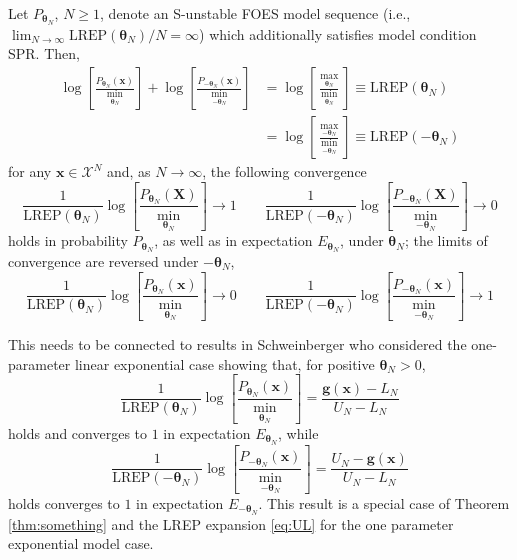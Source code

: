 \documentclass[12pt]{article}
\theoremstyle{definition}
\newcommand{\REP}{\mathrm{LREP}}
\let\BeginKnitrBlock\begin \let\EndKnitrBlock\end
\begin{document}
\BeginKnitrBlock{theorem}
\protect\hypertarget{thm:something}{}{\label{thm:something}}Let
\(P_{\boldsymbol \theta_N}\), \(N \geq 1\), denote an S-unstable FOES
model sequence (i.e.,
\(\lim_{N\to \infty}\REP(\boldsymbol \theta_N)/N=\infty\)) which
additionally satisfies model condition SPR. Then,
\begin{align*}
\log\left[ \frac{P_{\boldsymbol \theta_N }(\boldsymbol x) }{\min_{\boldsymbol \theta_N}}\right] +  \log\left[ \frac{P_{-\boldsymbol \theta_N }(\boldsymbol x) }{\min_{-\boldsymbol \theta_N}}\right]  &=    \log\left[ \frac{\max_{\boldsymbol \theta_N}}{\min_{\boldsymbol \theta_N}}\right]  \equiv  \REP(\boldsymbol \theta_N)\\
& = \log\left[ \frac{\max_{-\boldsymbol \theta_N} }{\min_{-\boldsymbol \theta_N}}\right] \equiv \REP(-\boldsymbol \theta_N)
\end{align*}
for any \(\boldsymbol x\in\mathcal{X}^N\) and, as \(N\to \infty\), the
following convergence \[
\frac{1}{\REP(\boldsymbol \theta_N)} \log\left[ \frac{P_{\boldsymbol \theta_N }(\boldsymbol X) }{\min_{\boldsymbol \theta_N}}\right]  \rightarrow 1 \qquad \frac{1}{\REP(-\boldsymbol \theta_N)}\log\left[ \frac{P_{-\boldsymbol \theta_N }(\boldsymbol X) }{\min_{-\boldsymbol \theta_N}}\right]  \rightarrow 0
\] holds in probability \(P_{\boldsymbol \theta_N}\), as well as in
expectation \(E_{\boldsymbol \theta_N}\), under
\(\boldsymbol \theta_N\); the limits of convergence are reversed under
\(-\boldsymbol \theta_N\), \[
\frac{1}{\REP(\boldsymbol \theta_N)} \log\left[ \frac{P_{\boldsymbol \theta_N }(\boldsymbol x) }{\min_{\boldsymbol \theta_N}}\right]  \rightarrow 0 \qquad \frac{1}{\REP(-\boldsymbol \theta_N)}\log\left[ \frac{P_{-\boldsymbol \theta_N }(\boldsymbol x) }{\min_{-\boldsymbol \theta_N}}\right]  \rightarrow 1
\]
\EndKnitrBlock{theorem} This needs to be connected to results in
Schweinberger who considered the one-parameter linear exponential case
showing that, for positive \(\boldsymbol \theta_N>0\), \[
\frac{1}{\REP(\boldsymbol \theta_N)} \log\left[ \frac{P_{\boldsymbol \theta_N }(\boldsymbol x) }{\min_{\boldsymbol \theta_N}}\right] = \frac{\boldsymbol g(\boldsymbol x) - L_N}{U_N-L_N} 
\] holds and converges to \(1\) in expectation
\(E_{\boldsymbol \theta_N}\), while \[   
\frac{1}{\REP(-\boldsymbol \theta_N)} \log\left[ \frac{P_{-\boldsymbol \theta_N }(\boldsymbol x) }{\min_{-\boldsymbol \theta_N}}\right] = \frac{U_N -\boldsymbol g(\boldsymbol x)}{U_N-L_N} 
\] holds converges to \(1\) in expectation
\(E_{-\boldsymbol \theta_N}\). This result is a special case of Theorem
\ref{thm:something} and the LREP expansion \eqref{eq:UL} for the one
parameter exponential model case.
\end{document}
